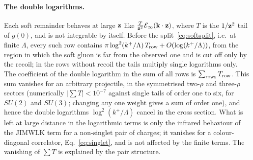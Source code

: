 \paragraph{The double logarithms.} Each soft remainder behaves at large $\mathbf{z}$ like $\frac{T}{\mathbf{z}^2}\mathcal E_\infty(\mathbf{k}\cdot\mathbf{z})$, where $T$ is the $1/\mathbf{z}^2$ tail of $g(0)$, and is not integrable by itself. Before the split~\eqref{eq:softsplit}, i.e.\ at finite $\Lambda$, every such row contains $\pi\log^2(k^+/\Lambda)\,T_{\rm row}+O(\log(k^+/\Lambda))$, from the region in which the soft gluon is far from the observed one and is cut off only by the recoil; in the rows without recoil the tails multiply single logarithms only. The coefficient of the double logarithm in the sum of all rows is $\sum_{\rm rows}T_{\rm row}$. This sum vanishes for an arbitrary projectile, in the symmetrised two-$\rho$ and three-$\rho$ sectors (numerically $|\sum T|<10^{-7}$ against single tails of order one to six, for $SU(2)$ and $SU(3)$; changing any one weight gives a sum of order one), and hence the double logarithms $\log^2(k^+/\Lambda)$ cancel in the cross section. What is left at large distance in the logarithmic terms is only the infrared behaviour of the JIMWLK term for a non-singlet pair of charges; it vanishes for a colour-diagonal correlator, Eq.~\eqref{eq:singlet}, and is not affected by the finite terms. The vanishing of $\sum T$ is explained by the pair structure.

